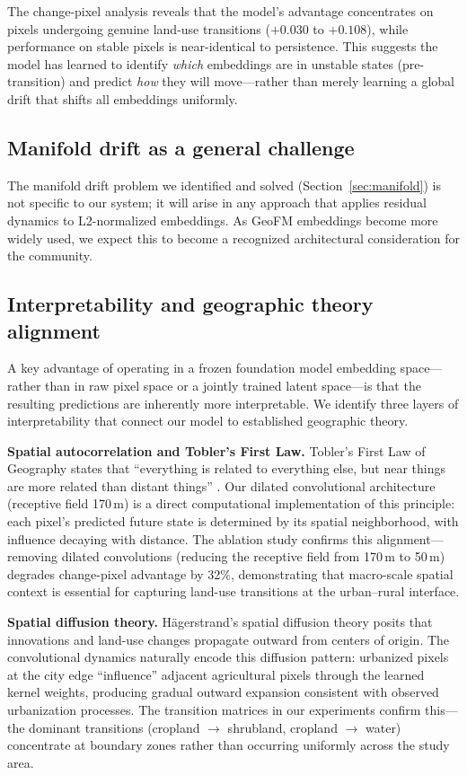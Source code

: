 \documentclass{article}
\begin{document}
The change-pixel analysis reveals that the model's advantage concentrates on pixels undergoing genuine land-use transitions ($+0.030$ to $+0.108$), while performance on stable pixels is near-identical to persistence. This suggests the model has learned to identify \textit{which} embeddings are in unstable states (pre-transition) and predict \textit{how} they will move---rather than merely learning a global drift that shifts all embeddings uniformly.

\subsection{Manifold drift as a general challenge}

The manifold drift problem we identified and solved (Section~\ref{sec:manifold}) is not specific to our system; it will arise in any approach that applies residual dynamics to L2-normalized embeddings. As GeoFM embeddings become more widely used, we expect this to become a recognized architectural consideration for the community.

\subsection{Interpretability and geographic theory alignment}
\label{sec:interpretability}

A key advantage of operating in a frozen foundation model embedding space---rather than in raw pixel space or a jointly trained latent space---is that the resulting predictions are inherently more interpretable. We identify three layers of interpretability that connect our model to established geographic theory.

\textbf{Spatial autocorrelation and Tobler's First Law.}
Tobler's First Law of Geography states that ``everything is related to everything else, but near things are more related than distant things'' \citep{tobler1970computer}. Our dilated convolutional architecture (receptive field 170\,m) is a direct computational implementation of this principle: each pixel's predicted future state is determined by its spatial neighborhood, with influence decaying with distance. The ablation study confirms this alignment---removing dilated convolutions (reducing the receptive field from 170\,m to 50\,m) degrades change-pixel advantage by 32\%, demonstrating that macro-scale spatial context is essential for capturing land-use transitions at the urban--rural interface.

\textbf{Spatial diffusion theory.}
H\"{a}gerstrand's spatial diffusion theory posits that innovations and land-use changes propagate outward from centers of origin. The convolutional dynamics naturally encode this diffusion pattern: urbanized pixels at the city edge ``influence'' adjacent agricultural pixels through the learned kernel weights, producing gradual outward expansion consistent with observed urbanization processes. The transition matrices in our experiments confirm this---the dominant transitions (cropland $\to$ shrubland, cropland $\to$ water) concentrate at boundary zones rather than occurring uniformly across the study area.
\end{document}
